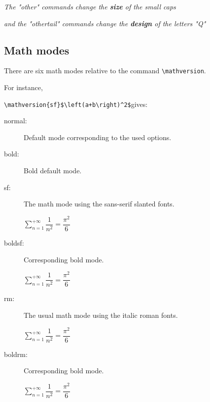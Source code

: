 \documentclass[a4paper,11pt]{christophe}
\begin{document}
\begin{center}
\textit{The "other" commands change the \textbf{size} of the small caps}

\textit{and the "othertail" commands change the \textbf{design} of the letters "Q"}
\end{center}

\begin{center}
\end{center}

\subsection{Math modes}

There are six math modes relative to the command \verb=\mathversion=.

For instance, 

\smallskip

\hfill\verb=\mathversion{sf}$\left(a+b\right)^2$=\quad gives:

\begin{description}
  \item[normal:] Default mode corresponding to the used options.
  \item[bold:] Bold default mode.
  \item[sf:] The math mode using the sans-serif slanted fonts.
  
             \qquad{}$\displaystyle\sum_{n=1}^{+\infty}\dfrac{1}{n^2}=\dfrac{\pi^2}{6}$
  \item[boldsf:] Corresponding bold mode.
  
             \qquad{}$\displaystyle\sum_{n=1}^{+\infty}\dfrac{1}{n^2}=\dfrac{\pi^2}{6}$
  \item[rm:] The usual math mode using the italic roman fonts.
  
             \qquad{}$\displaystyle\sum_{n=1}^{+\infty}\dfrac{1}{n^2}=\dfrac{\pi^2}{6}$
  \item[boldrm:] Corresponding bold mode.
  
             \qquad{}$\displaystyle\sum_{n=1}^{+\infty}\dfrac{1}{n^2}=\dfrac{\pi^2}{6}$
\end{description}
\end{document}
